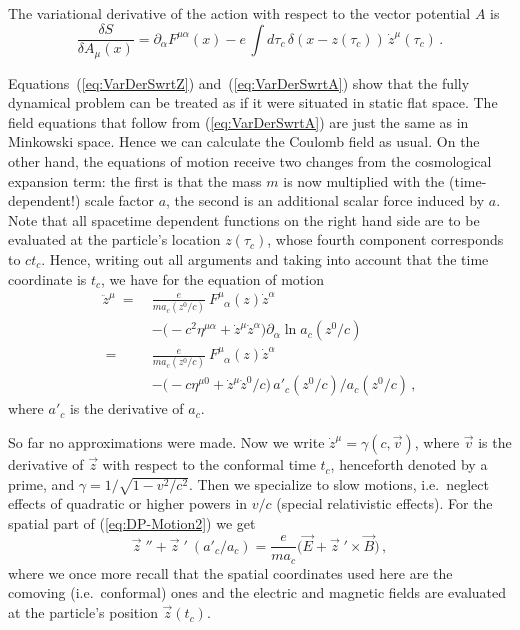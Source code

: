 \documentclass
[rmp,aps,twocolumn,showpacs,preprintnumbers,amsmath,amssymb]{revtex4}
\theoremstyle{plain}
\theoremstyle{definition}
\theoremstyle{remark}
\newcommand{\vecp}[1]{{\vec #1}\;\!'}         %
\newcommand{\vecpp}[1]{{\vec #1}\;\!''}       %
\begin{document}
The variational derivative of the action with respect to the 
vector potential $A$ is 
%
\begin{equation}\label{eq:VarDerSwrtA}
  \frac{\delta S}{\delta A_\mu(x)}
  =\partial_{\alpha}F^{\mu\alpha}(x)
  -e\,\int d\tau_c\,\delta(x-z(\tau_c))\,\dot z^\mu(\tau_c)\,. 
\end{equation}
%

Equations~(\ref{eq:VarDerSwrtZ}) and~(\ref{eq:VarDerSwrtA}) show that the 
fully dynamical problem can be treated as if it were situated in static 
flat space. The field equations that follow from (\ref{eq:VarDerSwrtA}) 
are just the same as in Minkowski space. Hence we can calculate the Coulomb 
field as usual. On the other hand, the equations of motion receive two 
changes from the cosmological expansion term: the first is that the mass 
$m$ is now multiplied with the (time-dependent!) scale factor $a$, the 
second is an additional scalar force induced by $a$. Note that all spacetime 
dependent functions on the right hand side are to be evaluated at the 
particle's location $z(\tau_c)$, whose fourth component corresponds to 
$ct_c$. Hence, writing out all arguments and taking into account that the 
time coordinate is $t_c$, we have for the equation of motion 
%
\begin{subequations}\label{eq:DP-Motion}
\begin{alignat}{1}
\ddot z^\mu
\ =\ &\frac{e}{ma_c(z^0/c)}\ F^\mu_{\phantom{\mu}\alpha}(z)\dot z^\alpha
\nonumber\\
\label{eq:DP-Motion1}
     & - \bigl(-c^2\eta^{\mu\alpha}+\dot z^\mu\dot z^\alpha\bigr)
         \partial_\alpha\ln a_c(z^0/c)\\
\ =\ &\frac{e}{ma_c(z^0/c)}\ F^\mu_{\phantom{\mu}\alpha}(z)\dot z^\alpha
\nonumber\\
\label{eq:DP-Motion2}
     & - \bigl(-c\eta^{\mu 0}+\dot z^\mu\dot z^0/c\bigr)
         \,a'_c(z^0/c)/a_c(z^0/c)\,,  
\end{alignat}    
\end{subequations}
%
where $a'_c$ is the derivative of $a_c$.

So far no approximations were made. Now we write $\dot z^\mu=\gamma(c,\vec v)$,
where $\vec v$ is the derivative of $\vec z$ with respect to the 
conformal time $t_c$, henceforth denoted by a prime, and 
$\gamma=1/\sqrt{1-v^2/c^2}$. Then we specialize to slow motions, 
i.e.~neglect effects of quadratic or higher powers in $v/c$ (special
relativistic effects). For the spatial part of (\ref{eq:DP-Motion2}) we get
%
\begin{equation}\label{eq:DP-Motion3}
  \vecpp{z} + \vecp{z}\ (a'_c/a_c)
  =\frac{e}{ma_c}\bigl( \vec E + \vecp{z} \times \vec B \bigr)\,,
\end{equation}
%
where we once more recall that the spatial coordinates used here are 
the comoving (i.e.~conformal) ones and the electric and 
magnetic fields are evaluated at the particle's position $\vec z(t_c)$. 
\end{document}
